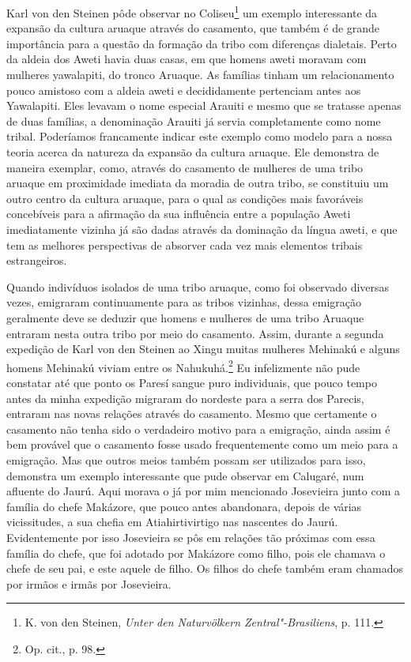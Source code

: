 Karl von den Steinen pôde observar no Coliseu\footnote{K. von den
  Steinen, \emph{Unter den Naturvölkern Zentral"-Brasiliens}, p. 111.} um
exemplo interessante da expansão da cultura aruaque através do
casamento, que também é de grande importância para a questão da formação
da tribo com diferenças dialetais. Perto da aldeia dos Aweti havia duas
casas, em que homens aweti moravam com mulheres yawalapiti, do tronco
Aruaque. As famílias tinham um relacionamento pouco amistoso com a
aldeia aweti e decididamente pertenciam antes aos Yawalapiti. Eles
levavam o nome especial Arauiti e mesmo que se tratasse apenas de duas
famílias, a denominação Arauiti já servia completamente como nome
tribal. Poderíamos francamente indicar este exemplo como modelo para a
nossa teoria acerca da natureza da expansão da cultura aruaque. Ele
demonstra de maneira exemplar, como, através do casamento de mulheres de
uma tribo aruaque em proximidade imediata da moradia de outra tribo, se
constituiu um outro centro da cultura aruaque, para o qual as condições
mais favoráveis concebíveis para a afirmação da sua influência entre a
população Aweti imediatamente vizinha já são dadas através da dominação
da língua aweti, e que tem as melhores perspectivas de absorver cada vez
mais elementos tribais estrangeiros.

Quando indivíduos isolados de uma tribo aruaque, como foi observado
diversas vezes, emigraram continuamente para as tribos vizinhas, dessa
emigração geralmente deve se deduzir que homens e mulheres de uma tribo
Aruaque entraram nesta outra tribo por meio do casamento. Assim, durante
a segunda expedição de Karl von den Steinen ao Xingu muitas mulheres
Mehinakú e alguns homens Mehinakú viviam entre os Nahukuhá.\footnote{Op.
  cit., p. 98.} Eu infelizmente não pude constatar até que ponto os
Paresí sangue puro individuais, que pouco tempo antes da minha expedição
migraram do nordeste para a serra dos Parecis, entraram nas novas
relações através do casamento. Mesmo que certamente o casamento não
tenha sido o verdadeiro motivo para a emigração, ainda assim é bem
provável que o casamento fosse usado frequentemente como um meio para a
emigração. Mas que outros meios também possam ser utilizados para isso,
demonstra um exemplo interessante que pude observar em Calugaré, num
afluente do Jaurú. Aqui morava o já por mim mencionado Josevieira junto
com a família do chefe Makázore, que pouco antes abandonara, depois de
várias vicissitudes, a sua chefia em Atiahirtivirtigo nas nascentes do
Jaurú. Evidentemente por isso Josevieira se pôs em relações tão
próximas com essa família do chefe, que foi adotado por Makázore como
filho, pois ele chamava o chefe de seu pai, e este aquele de filho. Os
filhos do chefe também eram chamados por irmãos e irmãs por Josevieira.

